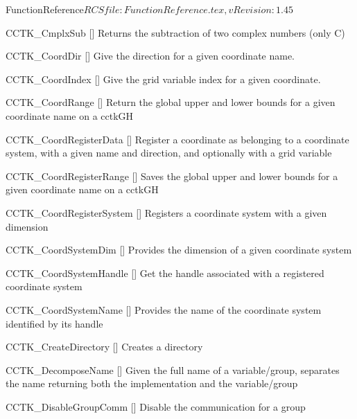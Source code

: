 \begin{cactuspart}{5}{FunctionReference}{$RCSfile: FunctionReference.tex,v $}{$Revision: 1.45 $}
\begin{Lentry}
\item[CCTK\_CmplxSub]
  [\pageref{CCTK-CmplxSub}]
  Returns the subtraction of two complex numbers (only C)

\item[CCTK\_CoordDir]
  [\pageref{CCTK-CoordDir}]
  Give the direction for a given coordinate name.

\item[CCTK\_CoordIndex]
  [\pageref{CCTK-CoordIndex}]
  Give the grid variable index for a given coordinate.

\item[CCTK\_CoordRange]
  [\pageref{CCTK-CoordRange}]
  Return the global upper and lower bounds for a given coordinate name on a cctkGH

\item[CCTK\_CoordRegisterData]
  [\pageref{CCTK-CoordRegisterData}]
  Register a coordinate as belonging to a coordinate system, with a given name and direction, and
  optionally with a grid variable

\item[CCTK\_CoordRegisterRange]
  [\pageref{CCTK-CoordRegisterRange}]
  Saves the global upper and lower bounds for a given coordinate name on a cctkGH

\item[CCTK\_CoordRegisterSystem]
  [\pageref{CCTK-CoordRegisterSystem}]
  Registers a coordinate system with a given dimension

\item[CCTK\_CoordSystemDim]
  [\pageref{CCTK-CoordDim}]
  Provides the dimension of a given coordinate system

\item[CCTK\_CoordSystemHandle]
  [\pageref{CCTK-CoordSystemHandle}]
  Get the handle associated with a registered coordinate system

\item[CCTK\_CoordSystemName]
  [\pageref{CCTK-CoordSystemName}]
  Provides the name of the coordinate system identified by its handle

\item[CCTK\_CreateDirectory]
  [\pageref{CCTK-CreateDirectory}]
  Creates a directory

\item[CCTK\_DecomposeName]
  [\pageref{CCTK-DecomposeName}]
  Given the full name of a variable/group, separates the name returning both the implementation and the variable/group

\item[CCTK\_DisableGroupComm]
  [\pageref{CCTK-DisableGroupComm}]
  Disable the communication for a group


\end{Lentry}
\end{cactuspart}
